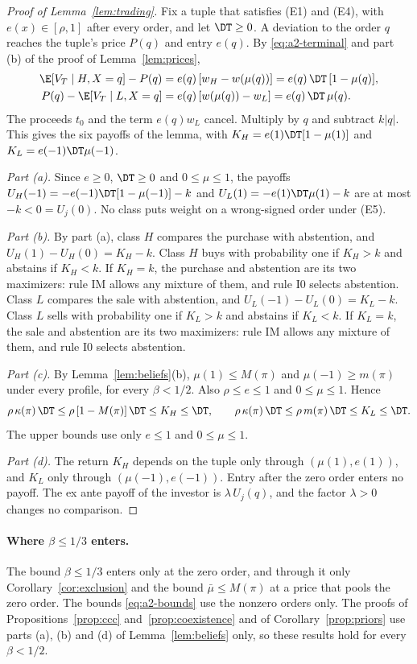 \begin{proof}[Proof of Lemma~\ref{lem:trading}]
Fix a tuple that satisfies (E1) and (E4), with \(e(x)\in[\rho,1]\) after every order, and let \(\DT\ge0\). A
deviation to the order \(q\) reaches the tuple's price \(P(q)\) and entry \(e(q)\). By \eqref{eq:a2-terminal} and
part (b) of the proof of Lemma~\ref{lem:prices},
\[
\begin{aligned}
\E[V_T\mid H,X=q]-P(q)&=e(q)\,[w_H-w(\mu(q))]=e(q)\,\DT\,[1-\mu(q)],\\
P(q)-\E[V_T\mid L,X=q]&=e(q)\,[w(\mu(q))-w_L]=e(q)\,\DT\,\mu(q).
\end{aligned}
\]
The proceeds \(t_0\) and the term \(e(q)w_L\) cancel. Multiply by \(q\) and subtract \(k|q|\). This gives the six
payoffs of the lemma, with \(K_H=e(1)\DT[1-\mu(1)]\) and \(K_L=e(-1)\DT\mu(-1)\).

\emph{Part (a).} Since \(e\ge0\), \(\DT\ge0\) and \(0\le\mu\le1\), the payoffs \(U_H(-1)=-e(-1)\DT[1-\mu(-1)]-k\)
and \(U_L(1)=-e(1)\DT\mu(1)-k\) are at most \(-k<0=U_j(0)\). No class puts weight on a wrong-signed order under
(E5).

\emph{Part (b).} By part (a), class \(H\) compares the purchase with abstention, and
\(U_H(1)-U_H(0)=K_H-k\). Class \(H\) buys with probability one if \(K_H>k\) and abstains if \(K_H<k\). If \(K_H=k\),
the purchase and abstention are its two maximizers: rule IM allows any mixture of them, and rule I0 selects
abstention. Class \(L\) compares the sale with abstention, and \(U_L(-1)-U_L(0)=K_L-k\). Class \(L\) sells with
probability one if \(K_L>k\) and abstains if \(K_L<k\). If \(K_L=k\), the sale and abstention are its two maximizers:
rule IM allows any mixture of them, and rule I0 selects abstention.

\emph{Part (c).} By Lemma~\ref{lem:beliefs}(b), \(\mu(1)\le M(\pi)\) and \(\mu(-1)\ge m(\pi)\) under every profile,
for every \(\beta<1/2\). Also \(\rho\le e\le1\) and \(0\le\mu\le1\). Hence
\begin{equation}\label{eq:a2-bounds}
\rho\,\kappa(\pi)\,\DT\le\rho\,[1-M(\pi)]\,\DT\le K_H\le\DT,\qquad
\rho\,\kappa(\pi)\,\DT\le\rho\,m(\pi)\,\DT\le K_L\le\DT .
\end{equation}
The upper bounds use only \(e\le1\) and \(0\le\mu\le1\).

\emph{Part (d).} The return \(K_H\) depends on the tuple only through \((\mu(1),e(1))\), and \(K_L\) only through
\((\mu(-1),e(-1))\). Entry after the zero order enters no payoff. The ex ante payoff of the investor is
\(\lambda\,U_j(q)\), and the factor \(\lambda>0\) changes no comparison.
\end{proof}

\paragraph{Where \(\beta\le1/3\) enters.}
The bound \(\beta\le1/3\) enters only at the zero order, and through it only Corollary~\ref{cor:exclusion} and the
bound \(\bar\mu\le M(\pi)\) at a price that pools the zero order. The bounds \eqref{eq:a2-bounds} use the nonzero
orders only. The proofs of Propositions~\ref{prop:ccc} and~\ref{prop:coexistence} and of Corollary~\ref{prop:priors} use parts
(a), (b) and (d) of Lemma~\ref{lem:beliefs} only, so these results hold for every \(\beta<1/2\).
